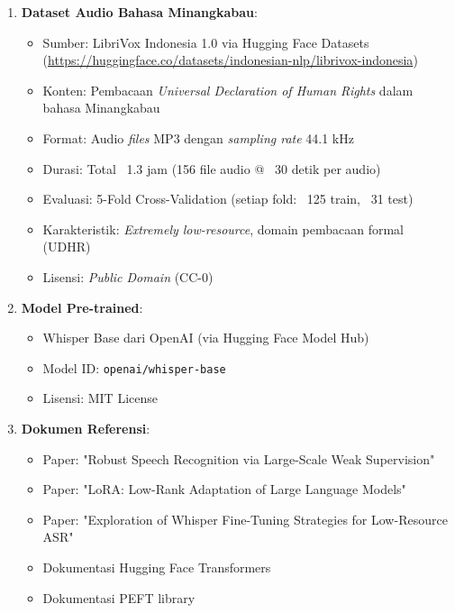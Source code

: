 \begin{enumerate}[noitemsep]
    \item \textbf{Dataset Audio Bahasa Minangkabau}:
    \begin{itemize}[noitemsep]
        \item Sumber: LibriVox Indonesia 1.0 via Hugging Face Datasets (\url{https://huggingface.co/datasets/indonesian-nlp/librivox-indonesia})
        \item Konten: Pembacaan \textit{Universal Declaration of Human Rights} dalam bahasa Minangkabau
        \item Format: Audio \textit{files} MP3 dengan \textit{sampling rate} 44.1 kHz
        \item Durasi: Total ~1.3 jam (156 file audio @ ~30 detik per audio)
        \item Evaluasi: 5-Fold Cross-Validation (setiap fold: ~125 train, ~31 test)
        \item Karakteristik: \textit{Extremely low-resource}, domain pembacaan formal (UDHR)
        \item Lisensi: \textit{Public Domain} (CC-0)
    \end{itemize}
    \item \textbf{Model Pre-trained}:
    \begin{itemize}[noitemsep]
        \item Whisper Base dari OpenAI (via Hugging Face Model Hub)
        \item Model ID: \texttt{openai/whisper-base}
        \item Lisensi: MIT License
    \end{itemize}
    \item \textbf{Dokumen Referensi}:
    \begin{itemize}[noitemsep]
        \item Paper: "Robust Speech Recognition via Large-Scale Weak Supervision" \cite{radford2023whisper}
        \item Paper: "LoRA: Low-Rank Adaptation of Large Language Models" \cite{hu2022lora}
        \item Paper: "Exploration of Whisper Fine-Tuning Strategies for Low-Resource ASR" \cite{liu2024exploration}
        \item Dokumentasi Hugging Face Transformers
        \item Dokumentasi PEFT library
    \end{itemize}
\end{enumerate}

